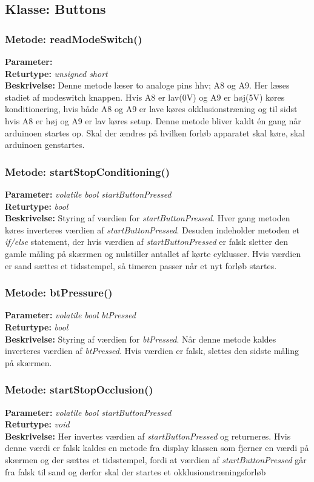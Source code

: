 \subsection{Klasse: Buttons}

\subsubsection{Metode: readModeSwitch()}
\textbf{Parameter: } 
\\ \textbf{Returtype: } \textit{unsigned short}
\\ \textbf{Beskrivelse: } Denne metode læser to analoge pins hhv; A8 og A9. Her læses stadiet af modeswitch knappen. Hvis A8 er lav(0V) og A9 er høj(5V) køres konditionering, hvis både A8 og A9 er lave køres okklusionstræning og til sidst hvis A8 er høj og A9 er lav køres setup. Denne metode bliver kaldt én gang når arduinoen startes op. Skal der ændres på hvilken forløb apparatet skal køre, skal arduinoen genstartes. 

\subsubsection{Metode: startStopConditioning()}
\textbf{Parameter: } \textit{volatile bool startButtonPressed}
\\ \textbf{Returtype: } \textit{bool}
\\ \textbf{Beskrivelse: } Styring af værdien for \textit{startButtonPressed}. Hver gang metoden køres inverteres værdien af \textit{startButtonPressed}. Desuden indeholder metoden et \textit{if/else} statement, der hvis værdien af \textit{startButtonPressed} er falsk sletter den gamle måling på skærmen og nulstiller antallet af kørte cyklusser. Hvis værdien er sand sættes et tidsstempel, så timeren passer når et nyt forløb startes.  

\subsubsection{Metode: btPressure()}
\textbf{Parameter: } \textit{volatile bool btPressed}
\\ \textbf{Returtype: } \textit{bool}
\\ \textbf{Beskrivelse: } Styring af værdien for \textit{btPressed}. Når denne metode kaldes inverteres værdien af \textit{btPressed}. Hvis værdien er falsk, slettes den sidste måling på skærmen.

\subsubsection{Metode: startStopOcclusion()}
\textbf{Parameter: } \textit{volatile bool startButtonPressed}
\\ \textbf{Returtype: } \textit{void}
\\ \textbf{Beskrivelse: } Her invertes værdien af \textit{startButtonPressed} og returneres. Hvis denne værdi er falsk kaldes en metode fra display klassen som fjerner en værdi på skærmen og der sættes et tidsstempel, fordi at værdien af \textit{startButtonPressed} går fra falsk til sand og derfor skal der startes et okklusionstræningsforløb 

